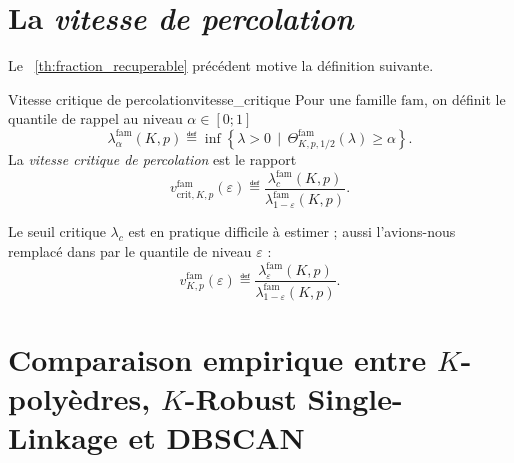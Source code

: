 \section{La \emph{vitesse de percolation}}

Le \Th~\ref{th:fraction_recuperable} précédent motive la définition suivante.

\begin{Definition}{Vitesse critique de percolation}{vitesse_critique}
Pour une famille $\mathrm{fam}$, on définit le quantile de rappel au niveau $\alpha \in [ 0 ; 1]$
\[
    \lambda^{\mathrm{fam}}_{\alpha}(K,p)
    \eqdef
    \inf\left\{
        \lambda>0 \, \mid \,
        \Theta^{\mathrm{fam}}_{K,p,1/2}(\lambda)
        \ge \alpha
    \right\}.
\]
La \emph{vitesse critique de percolation} est le rapport
\[
    v^{\mathrm{fam}}_{\mathrm{crit},K,p}(\varepsilon)
    \eqdef
    \frac{
        \lambda_c^{\mathrm{fam}}(K,p)
    }{
        \lambda^{\mathrm{fam}}_{1-\varepsilon}(K,p)
    }.
\]
\end{Definition}


Le seuil critique $\lambda_c$ est en pratique difficile à estimer ; aussi l'avions-nous remplacé dans \cite{BibiIstambul} par le quantile de niveau $\varepsilon$ :
\[
    v^{\mathrm{fam}}_{K,p}(\varepsilon)
    \eqdef
    \frac{
        \lambda_\varepsilon^{\mathrm{fam}}(K,p)
    }{
        \lambda_{1-\varepsilon}^{\mathrm{fam}}(K,p)
    }.
\]




\section{Comparaison empirique entre $K$-polyèdres, $K$-Robust Single-Linkage et DBSCAN}

